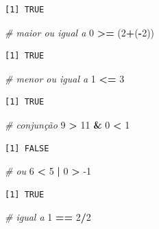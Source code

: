 \documentclass[12pt,brazil,]{book}
\newenvironment{Shaded}{\begin{snugshade}}{\end{snugshade}}
\newcommand{\CommentTok}[1]{\textcolor[rgb]{0.56,0.35,0.01}{\textit{#1}}}
\newcommand{\DecValTok}[1]{\textcolor[rgb]{0.00,0.00,0.81}{#1}}
\newcommand{\NormalTok}[1]{#1}
\newcommand{\OperatorTok}[1]{\textcolor[rgb]{0.81,0.36,0.00}{\textbf{#1}}}
\newcommand{\StringTok}[1]{\textcolor[rgb]{0.31,0.60,0.02}{#1}}
\begin{document}
\begin{verbatim}
[1] TRUE
\end{verbatim}

\begin{Shaded}
\begin{Highlighting}[]
\CommentTok{# maior ou igual a }
\DecValTok{0} \OperatorTok{>=}\StringTok{ }\NormalTok{(}\DecValTok{2}\OperatorTok{+}\NormalTok{(}\OperatorTok{-}\DecValTok{2}\NormalTok{))}
\end{Highlighting}
\end{Shaded}

\begin{verbatim}
[1] TRUE
\end{verbatim}

\begin{Shaded}
\begin{Highlighting}[]
\CommentTok{# menor ou igual a }
\DecValTok{1} \OperatorTok{<=}\StringTok{ }\DecValTok{3}
\end{Highlighting}
\end{Shaded}

\begin{verbatim}
[1] TRUE
\end{verbatim}

\begin{Shaded}
\begin{Highlighting}[]
\CommentTok{# conjunção}
\DecValTok{9} \OperatorTok{>}\StringTok{ }\DecValTok{11} \OperatorTok{&}\StringTok{ }\DecValTok{0} \OperatorTok{<}\StringTok{ }\DecValTok{1}
\end{Highlighting}
\end{Shaded}

\begin{verbatim}
[1] FALSE
\end{verbatim}

\begin{Shaded}
\begin{Highlighting}[]
\CommentTok{# ou}
\DecValTok{6} \OperatorTok{<}\StringTok{ }\DecValTok{5} \OperatorTok{|}\StringTok{ }\DecValTok{0} \OperatorTok{>}\StringTok{ }\DecValTok{-1}
\end{Highlighting}
\end{Shaded}

\begin{verbatim}
[1] TRUE
\end{verbatim}

\begin{Shaded}
\begin{Highlighting}[]
\CommentTok{# igual a}
\DecValTok{1} \OperatorTok{==}\StringTok{ }\DecValTok{2}\OperatorTok{/}\DecValTok{2}
\end{Highlighting}
\end{Shaded}
\end{document}
